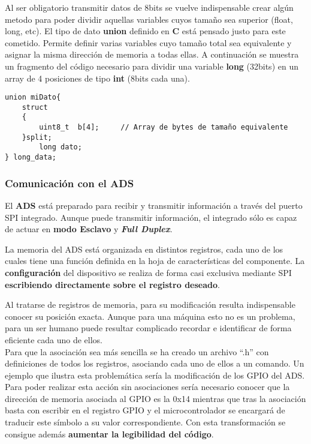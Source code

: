 Al ser obligatorio transmitir datos de 8bits se vuelve indispensable crear algún metodo para poder dividir aquellas variables cuyos tamaño sea superior (float, long, etc).
El tipo de dato \textbf{union} definido en \textbf{C} está pensado justo para este cometido. Permite definir varias variables cuyo tamaño total sea equivalente y asignar la misma dirección de memoria a todas ellas. A continuación se muestra un fragmento del código necesario para dividir una variable \textbf{long} (32bits) en un array de 4 posiciones de tipo \textbf{int} (8bits cada una).

\begin{lstlisting}[label=algoritmo:STM_Divisor,style = STM-code,frame=single,caption=División de variables en otras de menor tamaño]
union miDato{
	struct
	{
		uint8_t  b[4];     // Array de bytes de tamaño equivalente
	}split;
		long dato;
} long_data; 
\end{lstlisting}
\clearpage

\subsubsection{Comunicación con el ADS \label{sec:Software_micro_ADS}}

El \textbf{ADS} está preparado para recibir y transmitir información a través del puerto SPI integrado. Aunque puede transmitir información, el integrado sólo es capaz de actuar en \textbf{modo Esclavo} y \textbf{\textit{\gls{Full Duplex}}}.

La memoria del ADS está organizada en distintos registros, cada uno de los cuales tiene una función definida en la hoja de características del componente. La \textbf{configuración} del dispositivo se realiza de forma casi exclusiva mediante SPI \textbf{escribiendo directamente sobre el registro deseado}.

Al tratarse de registros de memoria, para su modificación resulta indispensable conocer su posición exacta. Aunque para una máquina esto no es un problema, para un ser humano puede resultar complicado recordar e identificar de forma eficiente cada uno de ellos. 
\\Para que la asociación sea más sencilla se ha creado un archivo ``.h'' con definiciones de todos los registros, asociando cada uno de ellos a un comando. Un ejemplo que ilustra esta problemática sería la modificación de los GPIO del ADS. Para poder realizar esta acción sin asociaciones sería necesario conocer que la dirección de memoria asociada al GPIO es la 0x14 mientras que tras la asociación basta con escribir en el registro \textsc{GPIO} y el microcontrolador se encargará de traducir este símbolo a su valor correspondiente. Con esta transformación se consigue además \textbf{aumentar la legibilidad del código}.

